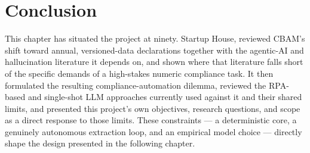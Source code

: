 \section{Conclusion}

This chapter has situated the project at ninety. Startup House, reviewed
CBAM's shift toward annual, versioned-data declarations together with the
agentic-AI and hallucination literature it depends on, and shown where
that literature falls short of the specific demands of a high-stakes
numeric compliance task. It then formulated the resulting
compliance-automation dilemma, reviewed the RPA-based and single-shot
LLM approaches currently used against it and their shared limits, and
presented this project's own objectives, research questions, and scope as
a direct response to those limits. These constraints --- a deterministic
core, a genuinely autonomous extraction loop, and an empirical model
choice --- directly shape the design presented in the following chapter.
